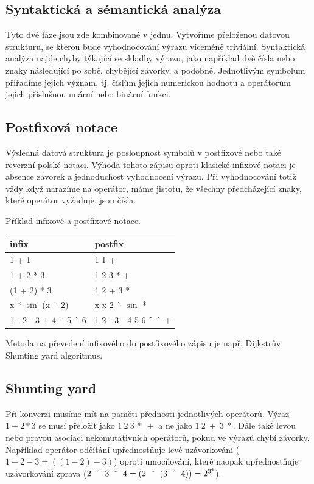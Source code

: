 \documentclass[11pt]{article}
\newcommand\CARET{\mathbin{\char`\^}}
\begin{document}
\subsection{Syntaktická a sémantická analýza}
Tyto dvě fáze jsou zde kombinované v jednu. Vytvoříme přeloženou datovou
strukturu, se kterou bude vyhodnocování výrazu víceméně triviální. Syntaktická
analýza najde chyby týkající se skladby výrazu, jako například dvě čísla nebo
znaky následující po sobě, chybějící závorky, a podobně. Jednotlivým symbolům
přiřadíme jejich význam, tj. číslům jejich numerickou hodnotu a operátorům
jejich příslušnou unární nebo binární funkci. 

\subsection{Postfixová notace}
Výsledná datová struktura je posloupnost symbolů v postfixové nebo také
reverzní polské notaci. Výhoda tohoto zápisu oproti klasické infixové notaci
je absence závorek a jednoduchost vyhodnocení výrazu. Při vyhodnocování totiž
vždy když narazíme na operátor, máme jistotu, že všechny předcházející znaky, 
které operátor vyžaduje, jsou čísla.

Příklad infixové a postfixové notace.
\begin{center}
\begin{tabular}{|l|l|}
\hline
infix & postfix \\
\hline
1 + 1 & 1 1 + \\
1 + 2 * 3 & 1 2 3 * + \\
(1 + 2) * 3 & 1 2 + 3 * \\
x * $\sin$ (x $\CARET$ 2) & x x 2 $\CARET$ $\sin$ * \\
1 - 2 - 3 + 4 $\CARET$ 5 $\CARET$ 6 & 1 2 - 3 - 4 5 6 $\CARET$ $\CARET$ + \\
\hline
\end{tabular}
\end{center}

Metoda na převedení infixového do postfixového zápisu je např. Dijkstrův
Shunting yard algoritmus.


\subsection{Shunting yard}
Při konverzi musíme mít na paměti přednosti jednotlivých operátorů. Výraz
$1 + 2 * 3$ se musí přeložit jako $1~2~3~*~+$ a ne jako $1~2~+~3~*$.  Dále také
levou nebo pravou asociaci nekomutativních operátorů, pokud ve výrazů chybí
závorky.  Například operátor odčítání upřednostňuje levé uzávorkování ($1 - 2 -
3 = ((1 - 2) - 3)$) oproti umocňování, které naopak upřednostňuje uzávorkování
zprava ($2~\CARET~3~\CARET~4 = (2~\CARET~(3~\CARET~4)) = 2^{3^4}$).
\end{document}
